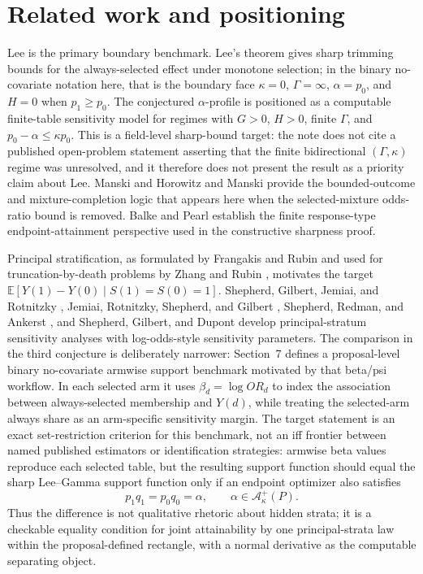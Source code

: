 \documentclass[11pt]{article}
\newcommand{\E}{\mathbb{E}}
\theoremstyle{definition}
\theoremstyle{plain}
\theoremstyle{remark}
\begin{document}
\section{Related work and positioning}
Lee \cite{Lee2009SampleSelection} is the primary boundary benchmark.  Lee's
theorem gives sharp trimming bounds for the always-selected effect under
monotone selection; in the binary no-covariate notation here, that is the
boundary face \(\kappa=0\), \(\Gamma=\infty\), \(\alpha=p_0\), and \(H=0\) when
\(p_1\ge p_0\).  The conjectured \(\alpha\)-profile is positioned as a
computable finite-table sensitivity model for regimes with \(G>0\), \(H>0\),
finite \(\Gamma\), and \(p_0-\alpha\le\kappa p_0\).  This is a field-level
sharp-bound target: the note does not cite a published open-problem statement asserting that the
finite bidirectional \((\Gamma,\kappa)\) regime was unresolved, and it therefore
does not present the result as a priority claim about Lee.  Manski
\cite{Manski1990} and Horowitz and Manski \cite{HorowitzManski1995} provide the
bounded-outcome and mixture-completion logic that appears here when the
selected-mixture odds-ratio bound is removed.  Balke and Pearl
\cite{BalkePearl1997} establish the finite response-type endpoint-attainment
perspective used in the constructive sharpness proof.

Principal stratification, as formulated by Frangakis and Rubin
\cite{FrangakisRubin2002} and used for truncation-by-death problems by Zhang and
Rubin \cite{ZhangRubin2003}, motivates the target
\(\E[Y(1)-Y(0)\mid S(1)=S(0)=1]\).  Shepherd, Gilbert, Jemiai, and Rotnitzky
\cite{ShepherdGilbertJemiaiRotnitzky2006}, Jemiai, Rotnitzky, Shepherd, and
Gilbert \cite{JemiaiRotnitzkyShepherdGilbert2007}, Shepherd, Redman, and
Ankerst \cite{ShepherdRedmanAnkerst2008}, and Shepherd, Gilbert, and Dupont
\cite{ShepherdGilbertDupont2011} develop principal-stratum sensitivity analyses
with log-odds-style sensitivity parameters.  The comparison in
the third conjecture is deliberately narrower: Section~7 defines a
proposal-level binary no-covariate armwise support benchmark motivated by that
beta/psi workflow.  In each selected arm it uses \(\beta_d=\log OR_d\) to index
the association between always-selected membership and \(Y(d)\), while treating
the selected-arm always share as an arm-specific sensitivity margin.  The
target statement is an exact set-restriction criterion for this benchmark, not an
iff frontier between named published estimators or identification strategies:
armwise beta values reproduce each selected table, but the resulting support
function should equal the sharp Lee--Gamma support function only if an endpoint
optimizer also satisfies
\[
  p_1q_1=p_0q_0=\alpha,\qquad \alpha\in\mathcal A_\kappa^+(P).
\]
Thus the difference is not qualitative rhetoric about hidden strata; it is a
checkable equality condition for joint attainability by one principal-strata
law within the proposal-defined rectangle, with a normal derivative as the
computable separating object.
\end{document}
